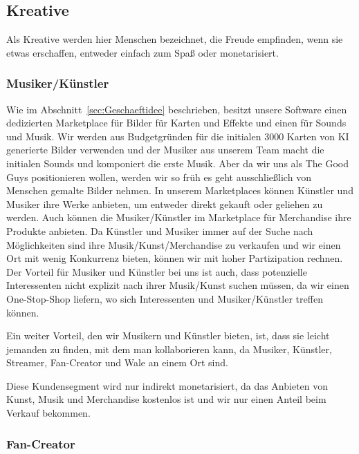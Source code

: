 \documentclass[fontsize=12, a4aper]{scrartcl}
\begin{document}
\subsection{Kreative} \label{subsec:Kreative}

Als Kreative werden hier Menschen bezeichnet, die Freude empfinden, wenn sie etwas erschaffen, entweder einfach zum Spaß oder monetarisiert.

\subsubsection{Musiker/Künstler} \label{subsubsec:Musiker_Kuenstler}

Wie im Abschnitt~\ref{sec:Geschaeftidee} beschrieben, besitzt unsere Software einen dedizierten Marketplace für Bilder für Karten und Effekte und einen für Sounds und Musik. Wir werden aus Budgetgründen für die initialen 3000 Karten von KI generierte Bilder verwenden und der Musiker aus unserem Team macht die initialen Sounds und komponiert die erste Musik. Aber da wir uns als \glqq The Good Guys\grqq{} positionieren wollen, werden wir so früh es geht ausschließlich von Menschen gemalte Bilder nehmen. In unserem Marketplaces können Künstler und Musiker ihre Werke anbieten, um entweder direkt gekauft oder geliehen zu werden. Auch können die Musiker/Künstler im Marketplace für Merchandise ihre Produkte anbieten. Da Künstler und Musiker immer auf der Suche nach Möglichkeiten sind ihre Musik/Kunst/Merchandise zu verkaufen und wir einen Ort mit wenig Konkurrenz bieten, können wir mit hoher Partizipation rechnen. Der Vorteil für Musiker und Künstler bei uns ist auch, dass potenzielle Interessenten nicht explizit nach ihrer Musik/Kunst suchen müssen, da wir einen One-Stop-Shop liefern, wo sich Interessenten und Musiker/Künstler treffen können.\hfill\newline

\noindent Ein weiter Vorteil, den wir Musikern und Künstler bieten, ist, dass sie leicht jemanden zu finden, mit dem man kollaborieren kann, da Musiker, Künstler, Streamer, Fan-Creator und Wale an einem Ort sind.\hfill\newline

Diese Kundensegment wird nur indirekt monetarisiert, da das Anbieten von Kunst, Musik und Merchandise kostenlos ist und wir nur einen Anteil beim Verkauf bekommen.

\subsubsection{Fan-Creator} \label{subsubsec:Fan_Creator}
\end{document}
